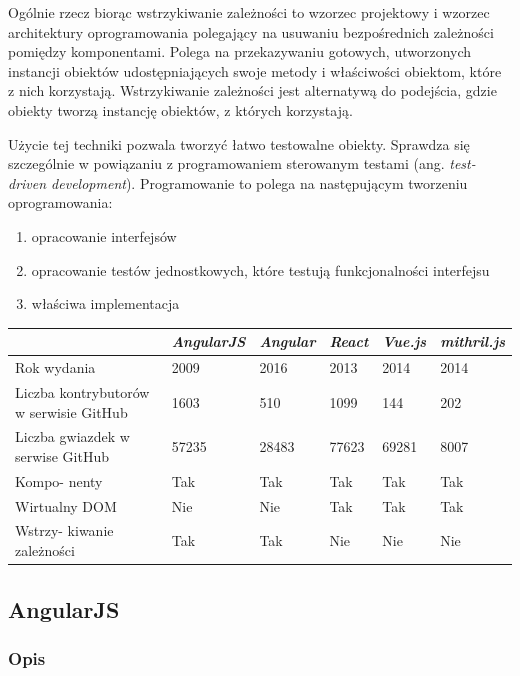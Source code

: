\documentclass[polish, twoside, 12pt]{mwart}
\begin{document}
Ogólnie rzecz biorąc wstrzykiwanie zależności to wzorzec projektowy i wzorzec architektury oprogramowania polegający na usuwaniu bezpośrednich zależności pomiędzy komponentami. Polega na przekazywaniu gotowych, utworzonych instancji obiektów udostępniających swoje metody i właściwości obiektom, które z nich korzystają. Wstrzykiwanie zależności jest alternatywą do podejścia, gdzie obiekty tworzą instancję obiektów, z których korzystają. 

Użycie tej techniki pozwala tworzyć łatwo testowalne obiekty. Sprawdza się szczególnie w powiązaniu z programowaniem sterowanym testami (ang. \emph{test-driven development}). Programowanie to polega na następującym tworzeniu oprogramowania:

\begin{enumerate} 
  \item opracowanie interfejsów
  \item opracowanie testów jednostkowych, które testują funkcjonalności interfejsu
  \item właściwa implementacja
\end{enumerate} 

\begin{center}
  \begin{tabularx}{\textwidth}{|X|X|X|X|X|X|}\hline
    & \emph{AngularJS} & \emph{Angular} & \emph{React} & \emph{Vue.js} & \emph{mithril.js}\\ \hline
    Rok wydania & 2009 & 2016 & 2013 & 2014 & 2014 \\ \hline
    Liczba kontrybutorów w serwisie GitHub & 1603 & 510 & 1099 & 144 & 202 \\ \hline
    Liczba gwiazdek w serwise GitHub & 57235 & 28483 & 77623 & 69281 & 8007 \\ \hline
    Kompo- nenty & Tak & Tak & Tak & Tak & Tak \\ \hline
    Wirtualny DOM & Nie & Nie & Tak & Tak & Tak \\ \hline
    Wstrzy- kiwanie zależności & Tak & Tak & Nie & Nie & Nie \\ \hline
  \end{tabularx}
\end{center}

\subsection{AngularJS}

\subsubsection{Opis}
\end{document}
